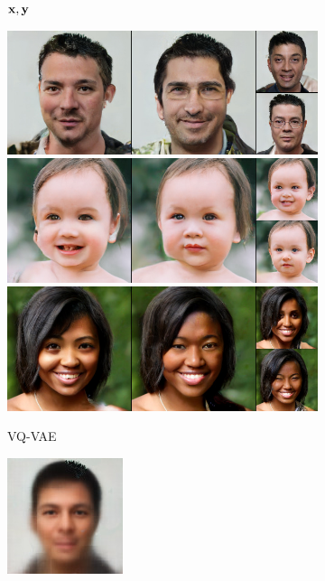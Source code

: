 \begin{figure}[t]
\begin{subfigure}[t]{0.22\textwidth}
      \caption*{$\mathbf{x}, \mathbf{y}$}
    \end{subfigure}
    \begin{subfigure}[t]{0.25\textwidth}
      \centering
      \includegraphics[height=\ffhqimgheight]{figs/cigcvae/image-samples/ffhq256/freeform_vq_vae_0_samples.jpg}
      \includegraphics[height=\ffhqimgheight]{figs/cigcvae/image-samples/ffhq256/freeform_vq_vae_13_samples.jpg}
      \includegraphics[height=\ffhqimgheight]{figs/cigcvae/image-samples/ffhq256/freeform_vq_vae_32_samples.jpg}
      \caption{VQ-VAE}
    \end{subfigure}
    \begin{subfigure}[t]{0.25\textwidth}
      \centering
      \includegraphics[height=\ffhqimgheight]{figs/cigcvae/image-samples/ffhq256/freeform_ce_0_samples.jpg}\\

\end{subfigure}
\end{figure}
